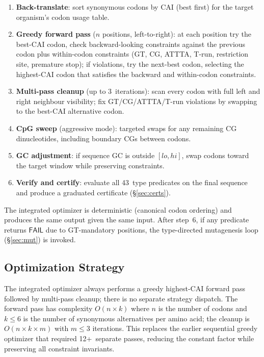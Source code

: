 \documentclass[acmsmall,review,anonymous]{acmart}
\newcommand{\FAIL}{\ensuremath{\mathsf{FAIL}}\xspace}
\begin{document}
\begin{enumerate}[leftmargin=*,itemsep=1pt,topsep=2pt]
\item \textbf{Back-translate}: sort synonymous codons by CAI
      (best first) for the target organism's codon usage table.
\item \textbf{Greedy forward pass} ($n$ positions, left-to-right):
      at each position try the best-CAI codon, check backward-looking
      constraints against the previous codon plus within-codon
      constraints (GT, CG, ATTTA, T-run, restriction site, premature
      stop); if violations, try the next-best codon, selecting the
      highest-CAI codon that satisfies the backward and within-codon
      constraints.
\item \textbf{Multi-pass cleanup} (up to 3~iterations): scan every
      codon with full left and right neighbour visibility; fix
      GT/CG/ATTTA/T-run violations by swapping to the best-CAI
      alternative codon.
\item \textbf{CpG sweep} (aggressive mode): targeted swaps for any
      remaining CG dinucleotides, including boundary CGs between codons.
\item \textbf{GC adjustment}: if sequence GC is outside $[lo, hi]$,
      swap codons toward the target window while preserving constraints.
\item \textbf{Verify and certify}: evaluate all 43~type predicates on
      the final sequence and produce a graduated certificate
      (\S\ref{sec:certs}).
\end{enumerate}

The integrated optimizer is deterministic (canonical codon ordering)
and produces the same output given the same input.  After step~6, if
any predicate returns \FAIL{} due to GT-mandatory positions, the
type-directed mutagenesis loop (\S\ref{sec:mut}) is invoked.

\subsection{Optimization Strategy}\label{sec:strategies}

The integrated optimizer always performs a greedy highest-CAI forward
pass followed by multi-pass cleanup; there is no separate strategy
dispatch.  The forward pass has complexity $O(n \times k)$ where $n$
is the number of codons and $k \le 6$ is the number of synonymous
alternatives per amino acid; the cleanup is $O(n \times k \times m)$
with $m \le 3$ iterations.  This replaces the earlier sequential
greedy optimizer that required 12+~separate passes, reducing the
constant factor while preserving all constraint invariants.
\end{document}
